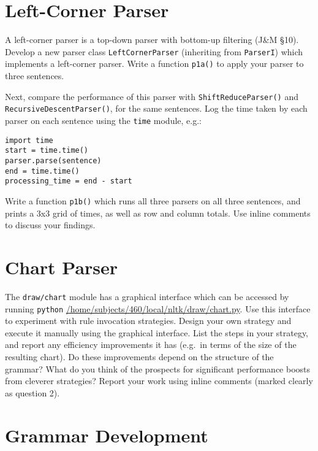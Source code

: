 \documentclass{460}
\begin{document}
\maketitle

\section{Left-Corner Parser}

A left-corner parser is a top-down parser with bottom-up filtering
(J\&M \S 10).  Develop a new parser class \texttt{LeftCornerParser}
(inheriting from
\texttt{ParserI}) which implements a left-corner parser.  Write a
function \texttt{p1a()} to apply your parser to three sentences.

Next, compare the performance of this parser with
\texttt{ShiftReduceParser()} and \texttt{RecursiveDescentParser()},
for the same sentences.  Log the time taken by each parser on
each sentence using the \texttt{time} module, e.g.:

\begin{verbatim}
import time
start = time.time()
parser.parse(sentence)
end = time.time()
processing_time = end - start
\end{verbatim}

Write a function \texttt{p1b()} which runs all three parsers on all
three sentences, and prints a 3x3 grid of times, as well as row and
column totals.  Use inline comments to discuss your findings.

\section{Chart Parser}

The \texttt{draw/chart} module has a graphical interface which can be
accessed by running \texttt{python} \url{/home/subjects/460/local/nltk/draw/chart.py}.
Use this interface to experiment with rule invocation
strategies.  Design your own strategy and execute it
manually using the graphical interface.  List the steps in your
strategy, and report any efficiency improvements it has (e.g.~in terms
of the size of the resulting chart).  Do these improvements depend on
the structure of the grammar?  What do you think of the prospects for
significant performance boosts from cleverer strategies?  Report your
work using inline comments (marked clearly as question 2).

\pagebreak

\section{Grammar Development}
\end{document}
